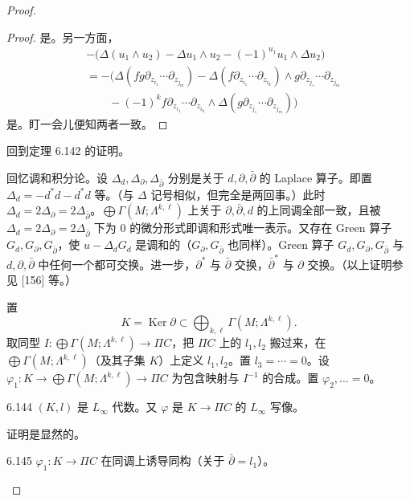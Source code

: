 \begin{proof}
\begin{proof}
    是。另一方面，
    \begin{align*}
      &-\bigl(\Delta(u_1\wedge u_2)-\Delta u_1\wedge u_2-(-1)^{u_1}u_1\wedge\Delta u_2\bigr)\\
      &=-\bigl(\Delta(fg\partial_{z_{i_1}}\cdots\partial_{z_{j_m}})
        -\Delta(f\partial_{z_{i_1}}\cdots\partial_{z_{i_k}})\wedge g\partial_{z_{j_1}}\cdots\partial_{z_{j_m}}\\
      &\qquad-(-1)^kf\partial_{z_{i_1}}\cdots\partial_{z_{i_k}}\wedge\Delta(g\partial_{z_{j_1}}\cdots\partial_{z_{j_m}})\bigr)
    \end{align*}
    是。盯一会儿便知两者一致。
  \end{proof}

  回到定理 6.142 的证明。

  回忆调和积分论。设 $\Delta_d,\Delta_\partial,\Delta_{\bar\partial}$ 分别是关于 $d,\partial,\bar\partial$ 的 Laplace 算子。即置 $\Delta_d=-d^*d-d^*d$ 等。（与 $\Delta$ 记号相似，但完全是两回事。）此时 $\Delta_d=2\Delta_\partial=2\Delta_{\bar\partial}$。$\bigoplus\Gamma(M;\Lambda^{k,\ell})$ 上关于 $\partial,\bar\partial,d$ 的上同调全部一致，且被 $\Delta_d=2\Delta_\partial=2\Delta_{\bar\partial}$ 下为 0 的微分形式即调和形式唯一表示。又存在 Green 算子 $G_d,G_\partial,G_{\bar\partial}$，使 $u-\Delta_dG_d$ 是调和的（$G_\partial,G_{\bar\partial}$ 也同样）。Green 算子 $G_d,G_\partial,G_{\bar\partial}$ 与 $d,\partial,\bar\partial$ 中任何一个都可交换。进一步，$\partial^*$ 与 $\bar\partial$ 交换，$\bar\partial^*$ 与 $\partial$ 交换。（以上证明参见 [156] 等。）

  置
  \[
    K=\operatorname{Ker}\partial\subset\bigoplus_{k,\ell}\Gamma(M;\Lambda^{k,\ell}).
  \]
  取同型 $I\colon\bigoplus\Gamma(M;\Lambda^{k,\ell})\to\Pi C$，把 $\Pi C$ 上的 $l_1,l_2$ 搬过来，在 $\bigoplus\Gamma(M;\Lambda^{k,\ell})$（及其子集 $K$）上定义 $l_1,l_2$。置 $l_3=\cdots=0$。设 $\varphi_1\colon K\to\bigoplus\Gamma(M;\Lambda^{k,\ell})\to\Pi C$ 为包含映射与 $I^{-1}$ 的合成。置 $\varphi_2,\dots=0$。

  \begin{lemma}{6.144}
    $(K,l)$ 是 $L_{\infty}$ 代数。又 $\varphi$ 是 $K\to\Pi C$ 的 $L_{\infty}$ 写像。
  \end{lemma}

  证明是显然的。

  \begin{lemma*}{6.145}
    $\varphi_1\colon K\to\Pi C$ 在同调上诱导同构（关于 $\bar\partial=l_1$）。
  \end{lemma*}


\end{proof}
